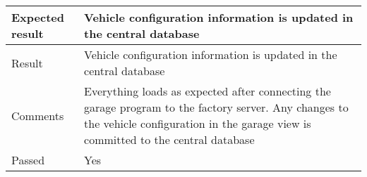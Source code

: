 \begin{table}[H]
\begin{tabularx}{1.0\textwidth}{
    |p{}     %
    |p{}|    %
}
Expected result
& Vehicle configuration information is updated in the central database
\\
\hline

Result
& Vehicle configuration information is updated in the central database
\\
\hline

Comments
& Everything loads as expected after connecting the garage program to the factory server. Any changes to the vehicle configuration in the garage view is committed to the central database
\\
\hline

Passed
& Yes
\\
\hline

\end{tabularx}
\end{table}


